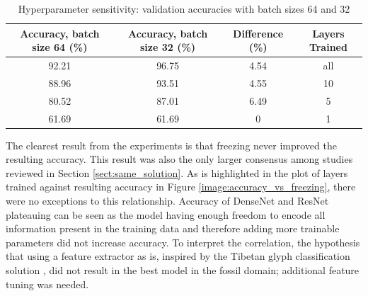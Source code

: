 \documentclass{article}
\begin{document}
\begin{table}[ht]
    \centering
        \begin{tabular}{|c|c|c|c|}
            \hline
            \textbf{Accuracy, batch size 64 (\%)} & \textbf{Accuracy, batch size 32 (\%)} & \textbf{Difference} (\%) & \textbf{Layers Trained} \\ \hline
            92.21 & 96.75 & 4.54 & all \\\hline
            88.96 & 93.51 & 4.55 & 10  \\\hline
            80.52 & 87.01 & 6.49 & 5   \\\hline
            61.69 & 61.69 & 0 & 1   \\\hline
        \end{tabular}
    \caption{Hyperparameter sensitivity: validation accuracies with batch sizes 64 and 32}
    \label{table:hyperparameter_sensitivity}
\end{table}

The clearest result from the experiments is that freezing never improved the resulting accuracy. This result was 
also the only larger consensus among studies reviewed in Section \ref{sect:same_solution}.
As is highlighted in the plot of layers trained against resulting accuracy in Figure \ref{image:accuracy_vs_freezing},
there were no exceptions to this relationship. Accuracy of DenseNet and ResNet plateauing can be seen as 
the model having enough freedom to encode all information present in the training data and therefore adding 
more trainable parameters did not increase accuracy. To interpret the correlation, the hypothesis that using a feature 
extractor as is, inspired by the Tibetan glyph classification solution \cite{4zhaoTibetan}, did not result in the 
best model in the fossil domain; additional feature tuning was needed.
\end{document}
